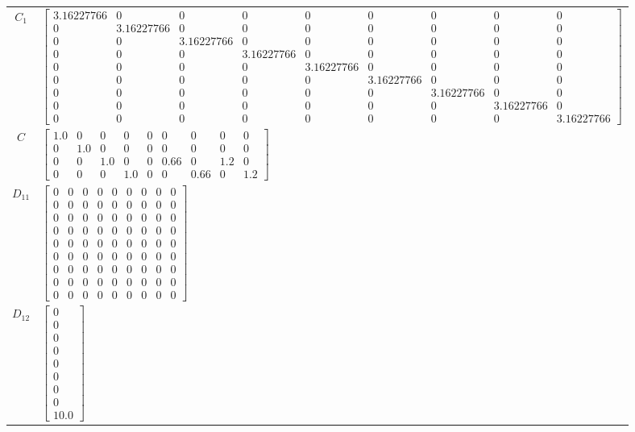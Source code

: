 \begin{tabular}{cl}
 $C_{1}$  & $\left[\begin{matrix}3.16227766 & 0 & 0 & 0 & 0 & 0 & 0 & 0 & 0\\0 & 3.16227766 & 0 & 0 & 0 & 0 & 0 & 0 & 0\\0 & 0 & 3.16227766 & 0 & 0 & 0 & 0 & 0 & 0\\0 & 0 & 0 & 3.16227766 & 0 & 0 & 0 & 0 & 0\\0 & 0 & 0 & 0 & 3.16227766 & 0 & 0 & 0 & 0\\0 & 0 & 0 & 0 & 0 & 3.16227766 & 0 & 0 & 0\\0 & 0 & 0 & 0 & 0 & 0 & 3.16227766 & 0 & 0\\0 & 0 & 0 & 0 & 0 & 0 & 0 & 3.16227766 & 0\\0 & 0 & 0 & 0 & 0 & 0 & 0 & 0 & 3.16227766\end{matrix}\right]$ \\
   $C$    & $\left[\begin{matrix}1.0 & 0 & 0 & 0 & 0 & 0 & 0 & 0 & 0\\0 & 1.0 & 0 & 0 & 0 & 0 & 0 & 0 & 0\\0 & 0 & 1.0 & 0 & 0 & 0.66 & 0 & 1.2 & 0\\0 & 0 & 0 & 1.0 & 0 & 0 & 0.66 & 0 & 1.2\end{matrix}\right]$                                                                                                                                                                                                                                               \\
 $D_{11}$ & $\left[\begin{matrix}0 & 0 & 0 & 0 & 0 & 0 & 0 & 0 & 0\\0 & 0 & 0 & 0 & 0 & 0 & 0 & 0 & 0\\0 & 0 & 0 & 0 & 0 & 0 & 0 & 0 & 0\\0 & 0 & 0 & 0 & 0 & 0 & 0 & 0 & 0\\0 & 0 & 0 & 0 & 0 & 0 & 0 & 0 & 0\\0 & 0 & 0 & 0 & 0 & 0 & 0 & 0 & 0\\0 & 0 & 0 & 0 & 0 & 0 & 0 & 0 & 0\\0 & 0 & 0 & 0 & 0 & 0 & 0 & 0 & 0\\0 & 0 & 0 & 0 & 0 & 0 & 0 & 0 & 0\end{matrix}\right]$                                                                                  \\
 $D_{12}$ & $\left[\begin{matrix}0\\0\\0\\0\\0\\0\\0\\0\\10.0\end{matrix}\right]$                                                                                                                                                                                                                                                                                                                                                                               \\

\end{tabular}

